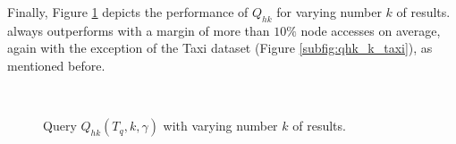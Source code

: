 Finally, Figure \ref{fig:query_qhk_k} depicts the performance of $Q_{hk}$ for varying number $k$ of results. \btsr always outperforms \tsr  with a margin of more than $10\%$ node accesses on average, again with the exception of the Taxi dataset (Figure \ref{subfig:qhk_k_taxi}), as mentioned before.

\begin{figure}[!ht]
	\centering
	 \\
	\caption{Query $Q_{hk}(T_q, k, \gamma)$ with varying number $k$ of results.}
	\label{fig:query_qhk_k}
\end{figure}

